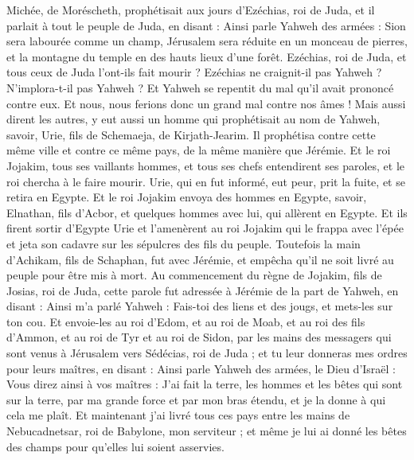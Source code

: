 \begin{multicols}{2}
Michée, de Moréscheth, prophétisait aux jours d'Ezéchias, roi de Juda, et il parlait à tout le peuple de Juda, en disant : Ainsi parle Yahweh des armées : Sion sera labourée comme un champ, Jérusalem sera réduite en un monceau de pierres, et la montagne du temple en des hauts lieux d'une forêt.
Ezéchias, roi de Juda, et tous ceux de Juda l'ont-ils fait mourir ? Ezéchias ne craignit-il pas Yahweh ? N'implora-t-il pas Yahweh ? Et Yahweh se repentit du mal qu'il avait prononcé contre eux. Et nous, nous ferions donc un grand mal contre nos âmes !
Mais aussi dirent les autres, y eut aussi un homme qui prophétisait au nom de Yahweh, savoir, Urie, fils de Schemaeja, de Kirjath-Jearim. Il prophétisa contre cette même ville et contre ce même pays, de la même manière que Jérémie.
Et le roi Jojakim, tous ses vaillants hommes, et tous ses chefs entendirent ses paroles, et le roi chercha à le faire mourir. Urie, qui en fut informé, eut peur, prit la fuite, et se retira en Egypte.
Et le roi Jojakim envoya des hommes en Egypte, savoir, Elnathan, fils d'Acbor, et quelques hommes avec lui, qui allèrent en Egypte.
Et ils firent sortir d'Egypte Urie et l'amenèrent au roi Jojakim qui le frappa avec l'épée et jeta son cadavre sur les sépulcres des fils du peuple.
Toutefois la main d'Achikam, fils de Schaphan, fut avec Jérémie, et empêcha qu'il ne soit livré au peuple pour être mis à mort.
\VerseOne{}Au commencement du règne de Jojakim, fils de Josias, roi de Juda, cette parole fut adressée à Jérémie de la part de Yahweh, en disant :
Ainsi m'a parlé Yahweh : Fais-toi des liens et des jougs, et mets-les sur ton cou.
Et envoie-les au roi d'Edom, et au roi de Moab, et au roi des fils d'Ammon, et au roi de Tyr et au roi de Sidon, par les mains des messagers qui sont venus à Jérusalem vers Sédécias, roi de Juda ;
et tu leur donneras mes ordres pour leurs maîtres, en disant : Ainsi parle Yahweh des armées, le Dieu d'Israël : Vous direz ainsi à vos maîtres :
J'ai fait la terre, les hommes et les bêtes qui sont sur la terre, par ma grande force et par mon bras étendu, et je la donne à qui cela me plaît.
Et maintenant j'ai livré tous ces pays entre les mains de Nebucadnetsar, roi de Babylone, mon serviteur ; et même je lui ai donné les bêtes des champs pour qu'elles lui soient asservies.

\end{multicols}
